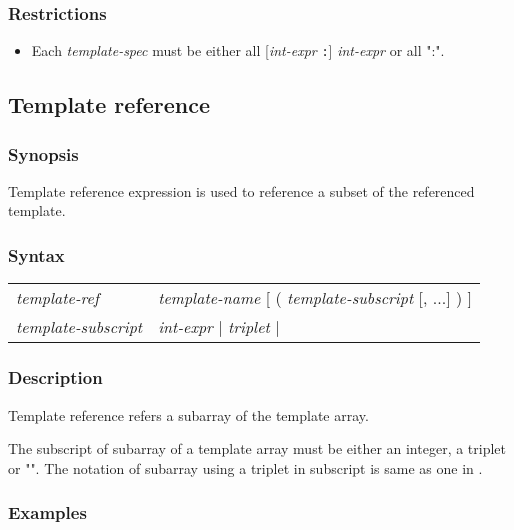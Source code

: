 \subsubsection*{Restrictions}

\begin{itemize}
\item Each {\it template-spec} must be either all [{\it int-expr} {\tt :}] {\it
  int-expr}
 or all ":".
\end{itemize}

\subsection{Template reference}

\subsubsection*{Synopsis}

Template reference expression is
used to reference a subset of the referenced template.

\subsubsection*{Syntax}

\begin{center}
\begin{tabular}{ll}
{\it template-ref} & {\it template-name} [ ( {\it template-subscript}
[,  ...] ) ] \\
{\it template-subscript} & {\it int-expr} | {\it triplet} | {\tt *} \\
\end{tabular}
\end{center}

\subsubsection*{Description}

Template reference refers a subarray of the template array.  

The subscript
of subarray of a template array must be either an integer, a triplet or
"{\tt *}". The notation of subarray using a triplet in subscript is same as
one in \Fort. 

\subsubsection*{Examples}

